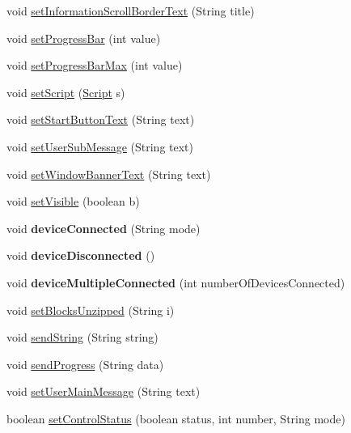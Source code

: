 \begin{DoxyCompactItemize}
\item 
void \hyperlink{class_g_u_i_1_1testing_1_1automatic_aeaac7118acdd913053a9331f406d9d1b}{set\-Information\-Scroll\-Border\-Text} (String title)
\item 
void \hyperlink{class_g_u_i_1_1testing_1_1automatic_a61eac590affebef093d851ab667cf8f6}{set\-Progress\-Bar} (int value)
\item 
void \hyperlink{class_g_u_i_1_1testing_1_1automatic_a80edc9880e888db4c798bc7a83790085}{set\-Progress\-Bar\-Max} (int value)
\item 
void \hyperlink{class_g_u_i_1_1testing_1_1automatic_a58cfb6e02a4bbbdca3a15d34314f6011}{set\-Script} (\hyperlink{class_c_a_s_u_a_l_1_1caspac_1_1_script}{Script} s)
\item 
void \hyperlink{class_g_u_i_1_1testing_1_1automatic_aa47b7603ba59eb1e2d9583855e08924c}{set\-Start\-Button\-Text} (String text)
\item 
void \hyperlink{class_g_u_i_1_1testing_1_1automatic_ab5eee899b75ef6932666f8364056b3c0}{set\-User\-Sub\-Message} (String text)
\item 
void \hyperlink{class_g_u_i_1_1testing_1_1automatic_a6827a03d1a8243832ebb4787ab798792}{set\-Window\-Banner\-Text} (String text)
\item 
void \hyperlink{class_g_u_i_1_1testing_1_1automatic_aabce92c87447ab9d07e1407b2212e38b}{set\-Visible} (boolean b)
\item 
\hypertarget{class_g_u_i_1_1testing_1_1automatic_ad1ce66c1fbf356eb227a037028f34156}{void {\bfseries device\-Connected} (String mode)}\label{class_g_u_i_1_1testing_1_1automatic_ad1ce66c1fbf356eb227a037028f34156}

\item 
\hypertarget{class_g_u_i_1_1testing_1_1automatic_af4e4b224ac56afffc095334549ecf69b}{void {\bfseries device\-Disconnected} ()}\label{class_g_u_i_1_1testing_1_1automatic_af4e4b224ac56afffc095334549ecf69b}

\item 
\hypertarget{class_g_u_i_1_1testing_1_1automatic_ad43d0bfc3c110b516d22e83c73fc0b23}{void {\bfseries device\-Multiple\-Connected} (int number\-Of\-Devices\-Connected)}\label{class_g_u_i_1_1testing_1_1automatic_ad43d0bfc3c110b516d22e83c73fc0b23}

\item 
void \hyperlink{class_g_u_i_1_1testing_1_1automatic_a7ac4d80d45919851bf85627853f40d63}{set\-Blocks\-Unzipped} (String i)
\item 
void \hyperlink{class_g_u_i_1_1testing_1_1automatic_a6e24fe81294766ade957d66f901382be}{send\-String} (String string)
\item 
void \hyperlink{class_g_u_i_1_1testing_1_1automatic_a988b6ddbf4c024470f436078a0191970}{send\-Progress} (String data)
\item 
void \hyperlink{class_g_u_i_1_1testing_1_1automatic_a400f90a87ae91a2df2108c91d847b470}{set\-User\-Main\-Message} (String text)
\item 
boolean \hyperlink{class_g_u_i_1_1testing_1_1automatic_a8dd9a5bf38eec0e10e5b70a4987fa580}{set\-Control\-Status} (boolean status, int number, String mode)
\end{DoxyCompactItemize}
